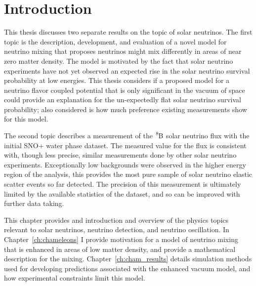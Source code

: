 
\chapter{Introduction}

\ifpdf
    \graphicspath{{physics/figures/PNG/}{physics/figures/PDF/}{physics/figures/}}
\else
    \graphicspath{{physics/figures/EPS/}{physics/figures/}}
\fi

This thesis discusses two separate results on the topic of solar neutrinos.
The first topic is the description, development, and evaluation of a novel
model for neutrino mixing that proposes neutrinos might mix differently in
areas of near zero matter density.
The model is motivated by the fact that solar neutrino experiments have
not yet observed an expected rise in the solar neutrino survival probability
at low energies.
This thesis considers if a proposed model for a neutrino flavor coupled potential
that is only significant in the vacuum of space
could provide an explanation for the un-expectedly flat solar neutrino
survival probability;
also considered is how much preference existing measurements show
for this model.


The second topic describes a measurement of the $\ce{^{8}B}$ solar
neutrino flux with the initial SNO+ water phase dataset.
The measured value for the flux is consistent with, though less precise, similar measurements
done by other solar neutrino experiments.
Exceptionally low backgrounds were observed in the higher energy region of the
analysis, this provides the most pure sample of solar neutrino elastic scatter 
events so far detected.
The precision of this measurement is ultimately limited by the available
statistics of the dataset, and so can be improved with further data taking.


This chapter provides and introduction and overview of the physics topics
relevant to solar neutrinos, neutrino detection, and neutrino oscillation.
In Chapter~\ref{ch:chameleons} I provide motivation for a model of neutrino
mixing that is enhanced in areas of low matter density, and provide a
mathematical description for the mixing.
Chapter~\ref{ch:cham_results} details simulation methods used for developing
predictions associated with the enhanced vacuum model, and how experimental
constraints limit this model. 

